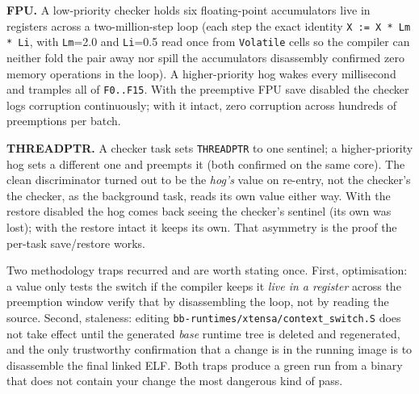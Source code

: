 \textbf{FPU.} A low-priority checker holds six floating-point accumulators live in
registers across a two-million-step loop (each step the exact identity
\texttt{X := X * Lm * Li}, with \texttt{Lm}=2.0 and \texttt{Li}=0.5 read once from
\texttt{Volatile} cells so the compiler can neither fold the pair away nor spill
the accumulators \textemdash{} disassembly confirmed zero memory operations in the
loop). A higher-priority hog wakes every millisecond and tramples all of
\texttt{F0..F15}. With the preemptive FPU save disabled the checker logs corruption
continuously; with it intact, zero corruption across hundreds of preemptions per
batch.

\textbf{THREADPTR.} A checker task sets \texttt{THREADPTR} to one sentinel; a
higher-priority hog sets a different one and preempts it (both confirmed on the
same core). The clean discriminator turned out to be the \emph{hog's} value on
re-entry, not the checker's \textemdash{} the checker, as the background task,
reads its own value either way. With the restore disabled the hog comes back
seeing the checker's sentinel (its own was lost); with the restore intact it keeps
its own. That asymmetry is the proof the per-task save/restore works.

Two methodology traps recurred and are worth stating once. First, optimisation:
a value only tests the switch if the compiler keeps it \emph{live in a register}
across the preemption window \textemdash{} verify that by disassembling the loop,
not by reading the source. Second, staleness: editing
\texttt{bb-runtimes/xtensa/context\_switch.S} does not take effect until the
generated \emph{base} runtime tree is deleted and regenerated, and the only
trustworthy confirmation that a change is in the running image is to disassemble
the final linked ELF. Both traps produce a green run from a binary that does not
contain your change \textemdash{} the most dangerous kind of pass.
